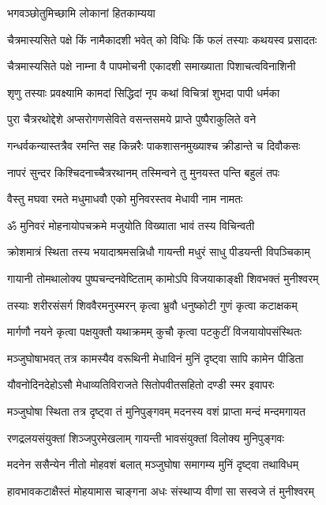 \onelineshloka
{भगवञ्छोतुमिच्छामि लोकानां हितकाम्यया} %

\twolineshloka
{चैत्रमास्यसिते पक्षे किं नामैकादशी भवेत्}
{को विधिः किं फलं तस्याः कथयस्व प्रसादतः} %


\twolineshloka
{चैत्रमास्यसिते पक्षे नाम्ना वै पापमोचनी}
{एकादशी समाख्याता पिशाचत्वविनाशिनी} %

\twolineshloka
{शृणु तस्याः प्रवक्ष्यामि कामदां सिद्धिदां नृप}
{कथां विचित्रां शुभदा पापी धर्मका} %

\twolineshloka
{पुरा चैत्ररथोद्देशे अप्सरोगणसेविते}
{वसन्तसमये प्राप्ते पुष्पैराकुलिते वने} %

\twolineshloka
{गन्धर्वकन्यास्तत्रैव रमन्ति सह किन्नरैः}
{पाकशासनमुख्याश्च क्रीडान्ते च दिवौकसः} %

\twolineshloka
{नापरं सुन्दर किश्चिदनाच्चैत्ररथानम्}
{तस्मिन्वने तु मुनयस्त पन्ति बहुलं तपः} %

\twolineshloka
{वैस्तु मघवा रमते मधुमाधवौ}
{एको मुनिवरस्तव मेधावी नाम नामतः} %

\twolineshloka
{ॐ मुनिवरं मोहनायोपचक्रमे}
{मजुयोति विख्याता भावं तस्य विचिन्वती} %

\twolineshloka
{क्रोशमात्रं स्थिता तस्य भयादाश्रमसन्निधौ}
{गायन्ती मधुरं साधु पीडयन्ती विपञ्चिकाम्} %

\twolineshloka
{गायानी तोमथालोक्य पुष्पचन्दनवेष्टिताम्}
{कामोऽपि विजयाकाङ्क्षी शिवभक्तं मुनीश्वरम्} %

\twolineshloka
{तस्याः शरीरसंसर्ग शिववैरमनुस्मरन्}
{कृत्वा भ्रुवौ धनुष्कोटी गुणं कृत्वा कटाक्षकम्} %

\twolineshloka
{मार्गणौ नयने कृत्वा पक्षयुक्तौ यथाक्रमम्}
{कुचौ कृत्वा पटकुटीं विजयायोपसंस्थितः} %

\twolineshloka
{मञ्जुघोषाभवत् तत्र कामस्यैव वरूथिनी}
{मेधाविनं मुनिं दृष्ट्वा सापि कामेन पीडिता} %

\twolineshloka
{यौवनोदिनदेहोऽसौ मेधाव्यतिविराजते}
{सितोपवीतसहितो दण्डी स्मर इवापरः} %

\twolineshloka
{मञ्जुघोषा स्थिता तत्र दृष्ट्वा तं मुनिपुङ्गवम्}
{मदनस्य वशं प्राप्ता मन्दं मन्दमगायत} %

\twolineshloka
{रणद्रलयसंयुक्तां शिञ्जपुरमेखलाम्}
{गायन्ती भावसंयुक्तां विलोक्य मुनिपुङ्गवः} %

\twolineshloka
{मदनेन ससैन्येन नीतो मोहवशं बलात्}
{मञ्जुघोषा समागम्य मुनिं दृष्ट्वा तथाविधम्} %

\twolineshloka
{हावभावकटाक्षैस्तं मोहयामास चाङ्गना}
{अधः संस्थाप्य वीणां सा सस्वजे तं मुनीश्वरम्} %

